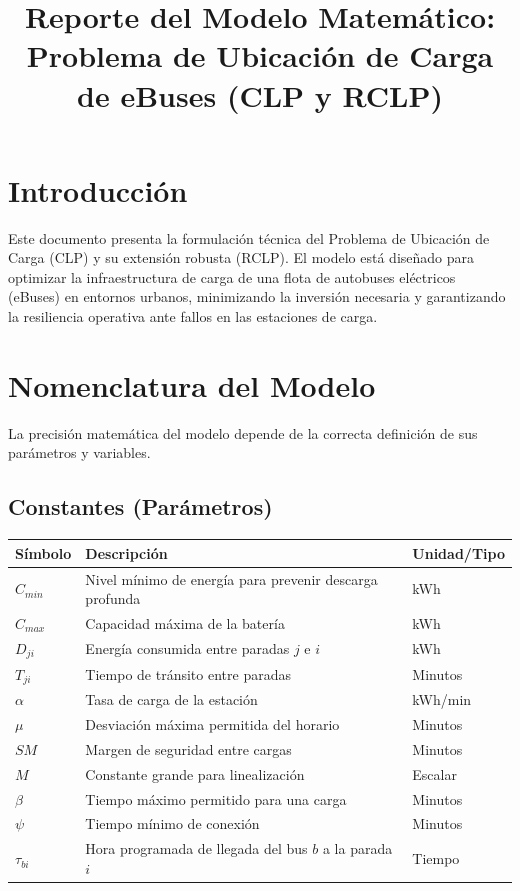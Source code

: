 \documentclass[12pt]{article}
\title{Reporte del Modelo Matemático:\\
Problema de Ubicación de Carga de eBuses (CLP y RCLP)}
\author{}
\date{}
\begin{document}
\maketitle

\section*{Introducción}

Este documento presenta la formulación técnica del Problema de Ubicación de Carga (CLP) y su extensión robusta (RCLP). 
El modelo está diseñado para optimizar la infraestructura de carga de una flota de autobuses eléctricos (eBuses) en entornos urbanos, minimizando la inversión necesaria y garantizando la resiliencia operativa ante fallos en las estaciones de carga.

\section{Nomenclatura del Modelo}

La precisión matemática del modelo depende de la correcta definición de sus parámetros y variables.

\subsection{Constantes (Parámetros)}

\begin{longtable}{lll}
\toprule
Símbolo & Descripción & Unidad/Tipo \\
\midrule
$C_{min}$ & Nivel mínimo de energía para prevenir descarga profunda & kWh \\
$C_{max}$ & Capacidad máxima de la batería & kWh \\
$D_{ji}$ & Energía consumida entre paradas $j$ e $i$ & kWh \\
$T_{ji}$ & Tiempo de tránsito entre paradas & Minutos \\
$\alpha$ & Tasa de carga de la estación & kWh/min \\
$\mu$ & Desviación máxima permitida del horario & Minutos \\
$SM$ & Margen de seguridad entre cargas & Minutos \\
$M$ & Constante grande para linealización & Escalar \\
$\beta$ & Tiempo máximo permitido para una carga & Minutos \\
$\psi$ & Tiempo mínimo de conexión & Minutos \\
$\tau_{bi}$ & Hora programada de llegada del bus $b$ a la parada $i$ & Tiempo \\
\bottomrule
\end{longtable}
\end{document}
